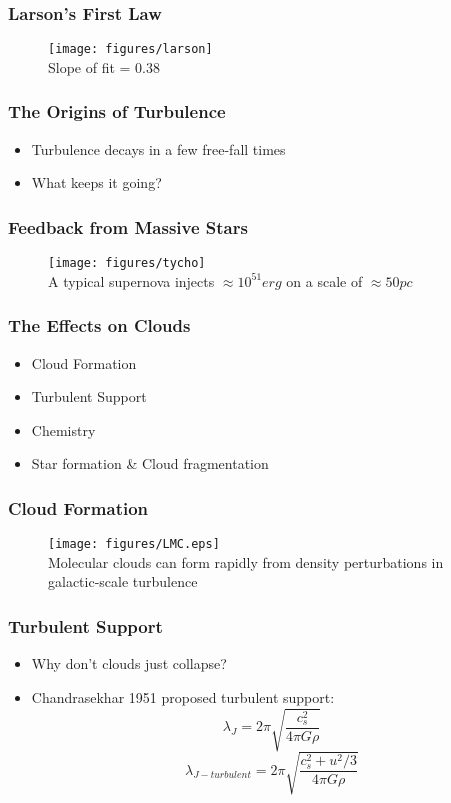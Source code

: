 \documentclass[serif,mathserif]{beamer}
\begin{document}
\begin{frame}
	\frametitle{Larson's First Law}
  \begin{figure}[t]
	\centering
	\texttt{[image: figures/larson]}\\
	Slope of fit = 0.38
  \end{figure}
\end{frame}

\begin{frame}
	\frametitle{The Origins of Turbulence}
  \begin{itemize}
	  \item Turbulence decays in a few free-fall times
	  \item What keeps it going?
  \end{itemize}
\end{frame}

\begin{frame}
	\frametitle{Feedback from Massive Stars}
  \begin{figure}[t]
	\centering
	\texttt{[image: figures/tycho]}\\
	A typical supernova injects $\approx 10^{51} erg$ on a scale of $\approx 50
	pc$
  \end{figure}
\end{frame}


\begin{frame}
	\frametitle{The Effects on Clouds}
  \begin{itemize}
	  \item Cloud Formation
	  \item Turbulent Support
	  \item Chemistry
	  \item Star formation \& Cloud fragmentation
  \end{itemize}
\end{frame}

\begin{frame}
	\frametitle{Cloud Formation}
  \begin{figure}[t]
	\centering
	\texttt{[image: figures/LMC.eps]}\\
	Molecular clouds can form rapidly from density perturbations in galactic-scale
	turbulence
  \end{figure}
\end{frame}

\begin{frame}
	\frametitle{Turbulent Support}
  \begin{itemize}
	  \item Why don't clouds just collapse?
	  \item Chandrasekhar 1951 proposed turbulent support:
    \begin{equation*}
		\lambda_J = 2\pi \sqrt{\frac{c_s^2}{4\pi G\rho}}
    \end{equation*}
    \begin{equation*}
		\lambda_{J-turbulent} = 2\pi \sqrt{\frac{c_s^2+u^2/3}{4\pi G\rho}}
    \end{equation*}
  \end{itemize}
\end{frame}
\end{document}
